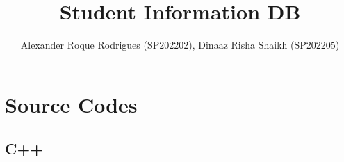 \documentclass[12pt,a4paper]{article}
\author{Alexander Roque Rodrigues (SP202202), Dinaaz Risha Shaikh (SP202205)}
\title{Student Information DB}
\begin{document}
\maketitle
\tableofcontents
\section{Source Codes}
\subsection{C++}
\inputminted[linenos, breaklines, tabsize=4, bgcolor=bg]{cpp}{classes.hpp}
\end{document}
